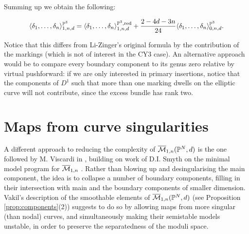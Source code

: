 Summing up we obtain the following:
\begin{prop} \[\langle \delta_1,\ldots,\delta_n \rangle^{\mathbb P^3}_{1,n,d}=\langle \delta_1,\ldots,\delta_n \rangle^{\mathbb P^3,\mathrm{red}}_{1,n,d}+\frac{2-4d-3n}{24}\langle \delta_1,\ldots,\delta_n \rangle^{\mathbb P^3}_{0,n,d}.\] \end{prop}
Notice that this differs from Li-Zinger's original formula by the contribution of the markings (which is not of interest in the CY3 case). An alternative approach would be to compare every boundary component to its genus zero relative by virtual pushforward: if we are only interested in primary insertions, notice that the components of $D^1$ such that more than one marking dwells on the elliptic curve will not contribute, since the excess bundle has rank two.

\section{Maps from curve singularities}\label{sec:singularities}
A different approach to reducing the complexity of $\overline{\mathcal{M}}_{1,n}(\mathbb P^N,d)$ is the one followed by M. Viscardi in \cite{VISC}, building on work of D.I. Smyth on the minimal model program for $\overline{\mathcal{M}}_{1,n}$ \cite{SMY1}. Rather than blowing up and desingularising the main component, the idea is to collapse a number of boundary components, filling in their intersection with main and the boundary components of smaller dimension. Vakil's description of the smoothable elements of $\overline{\mathcal{M}}_{1,n}(\mathbb P^N,d)$ (see Proposition \ref{prop:components}(2)) suggests to do so by allowing maps from more singular (than nodal) curves, and simultaneously making their semistable models unstable, in order to preserve the separatedness of the moduli space.

